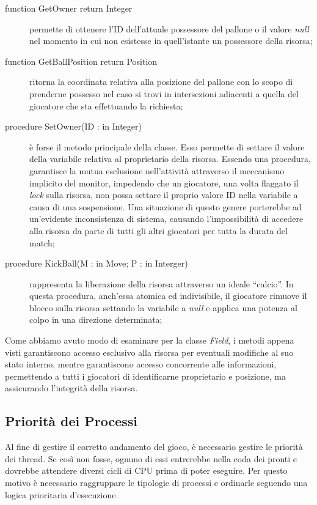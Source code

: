 \documentclass[aps,letterpaper,10pt]{article}
\begin{document}
\begin{description}
	\item[function GetOwner return Integer] permette di ottenere l'ID dell'attuale possessore del pallone o il valore \emph{null} nel momento in cui non esistesse in quell'istante un possessore della risorsa;
	\item[function GetBallPosition return Position] ritorna la coordinata relativa alla posizione del pallone con lo scopo di prenderne possesso nel caso si trovi in intersezioni adiacenti a quella del giocatore che sta effettuando la richiesta;
	\item[procedure SetOwner(ID : in Integer)] \`e forse il metodo principale della classe. Esso permette di settare il valore della variabile relativa al proprietario della risorsa. Essendo una procedura, garantisce la mutua esclusione nell'attivit\`a attraverso il meccanismo implicito del monitor, impedendo che un giocatore, una volta flaggato il \emph{lock} sulla risorsa, non possa settare il proprio valore ID nella variabile a causa di una sospensione. Una situazione di questo genere porterebbe ad un'evidente inconsistenza di sistema, causando l'impossibilit\`a di accedere alla risorsa da parte di tutti gli altri giocatori per tutta la durata del match;
	\item[procedure KickBall(M : in Move; P : in Interger)] rappresenta la liberazione della risorsa attraverso un ideale ``calcio''. In questa procedura, anch'essa atomica ed indivisibile, il giocatore rimuove il blocco sulla risorsa settando la variabile a \emph{null} e applica una potenza al colpo in una direzione determinata;
\end{description}

Come abbiamo avuto modo di esaminare per la classe \emph{Field}, i metodi appena visti garantiscono accesso esclusivo alla risorsa per eventuali modifiche al suo stato interno, mentre garantiscono accesso concorrente alle informazioni, permettendo a tutti i giocatori di identificarne proprietario e posizione, ma assicurando l'integrit\`a della risorsa.

\subsection{Priorit\`a dei Processi}
\label{priorita}

Al fine di gestire il corretto andamento del gioco, \`e necessario gestire le priorit\`a dei thread. Se cos\`i non fosse, ognuno di essi entrerebbe nella coda dei pronti e dovrebbe attendere diversi cicli di CPU prima di poter eseguire. Per questo motivo \`e necessario raggruppare le tipologie di processi e ordinarle seguendo una logica prioritaria d'esecuzione. \vspace{3mm}
\end{document}
